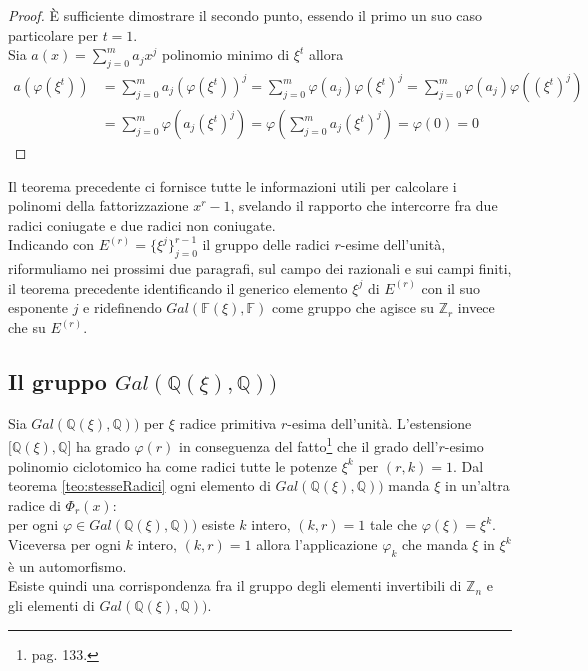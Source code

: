 \begin{proof}
È sufficiente dimostrare il secondo punto, essendo il primo un suo caso
particolare per $t = 1$. \\
Sia $a(x) = \sum_{j=0}^{m} a_{j}x^j$ polinomio minimo di $\xi^{t}$
allora 
\begin{align*}
      a(\varphi(\xi^t) ) &= \sum_{j=0}^{m} a_{j} (\varphi(\xi^t) )^j
                  = \sum_{j=0}^{m} \varphi(a_{j}) \varphi(\xi^t)^j  
                  = \sum_{j=0}^{m} \varphi(a_{j}) \varphi((\xi^t )^j) \\ 
                  &= \sum_{j=0}^{m} \varphi(a_{j}(\xi^t)^j)
                  = \varphi( \sum_{j=0}^{m} a_{j} (\xi^t )^j ) 
                  = \varphi(0) = 0
\end{align*}
\end{proof}
Il teorema precedente ci fornisce tutte le informazioni utili per calcolare i
polinomi della fattorizzazione $x^r - 1$, svelando il rapporto che intercorre
fra due radici coniugate e due radici non coniugate.\\
Indicando con $E^{(r)} = \lbrace \xi^{j}\rbrace_{j=0}^{r-1}$ il gruppo delle
radici $r$-esime dell'unità, riformuliamo nei prossimi due paragrafi, sul campo dei
razionali e sui campi finiti, il teorema precedente
identificando il generico elemento $\xi^{j}$ di $E^{(r)}$ con il suo esponente
$j$ e ridefinendo $Gal(\mathbb{F}(\xi), \mathbb{F})$ come gruppo che agisce su $\mathbb{Z}_{r}$ invece che su
$E^{(r)}$. 

\subsection{Il gruppo $Gal(\mathbb{Q}(\xi), \mathbb{Q}))$} \label{cap2:Grazionali}

Sia $Gal(\mathbb{Q}(\xi), \mathbb{Q}))$ per $\xi$ radice primitiva $r$-esima
dell'unità. L'estensione $\lbrack \mathbb{Q}(\xi), \mathbb{Q} \rbrack$ ha grado
$\varphi(r)$ in conseguenza del fatto\footnote{\cite{cattaneo} pag. 133.} che il grado dell'$r$-esimo polinomio
ciclotomico ha come radici tutte le potenze $\xi^{k}$ per $(r,k) = 1$.
Dal teorema \ref{teo:stesseRadici} ogni elemento di $Gal(\mathbb{Q}(\xi), \mathbb{Q}))$ manda $\xi$ in un'altra radice
di $\Phi_{r}(x)$:  \\
per ogni $\varphi \in Gal(\mathbb{Q}(\xi), \mathbb{Q}))$ esiste $k$ intero, $(k,r) = 1$ tale che 
$\varphi(\xi) = \xi^k $.  \\
Viceversa per ogni $k$ intero, $(k,r) = 1$ allora l'applicazione $\varphi_{k}$
che manda $\xi$ in $\xi^{k}$ è un automorfismo. \\
Esiste quindi una corrispondenza fra il gruppo degli elementi invertibili di
$\mathbb{Z}_{n}$ e gli elementi di $Gal(\mathbb{Q}(\xi), \mathbb{Q}))$.

